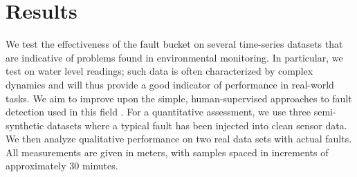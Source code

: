 \documentclass{article}
\newcommand{\psff}[1]{\texttt{[image: \#1.eps]}}
\begin{document}

\section{Results}
We test the effectiveness of the fault bucket on several time-series
datasets that are indicative of problems found in environmental
monitoring. In particular, we test on water level readings; such data
is often characterized by complex dynamics and will thus provide a
good indicator of performance in real-world tasks. We aim to improve upon the simple, human-supervised approaches to fault detection used in this field \cite{wagner2006guidelines}. For a quantitative
assessment, we use three semi-synthetic datasets where a typical fault
has been injected into clean sensor data. We then analyze qualitative
performance on two real data sets with actual faults. All measurements
are given in meters, with samples spaced in increments of
approximately 30 minutes.
\end{document}

